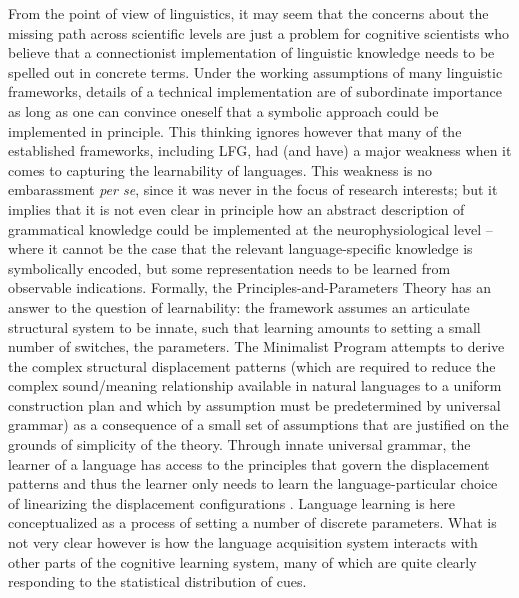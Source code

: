 \documentclass[output=paper,hidelinks]{langscibook}
\begin{document}
From the point of view of linguistics, it may seem that the concerns about the missing path across scientific levels are just a problem for cognitive scientists who believe that a connectionist implementation of linguistic knowledge needs to be spelled out in concrete terms. Under the working assumptions of many linguistic frameworks, details of a technical implementation are of subordinate importance as long as one can convince oneself that a symbolic approach could be implemented in principle.
This thinking ignores however that many of the established frameworks, including LFG, had (and have) a major weakness when it comes to capturing the learnability of languages. This weakness is no embarassment \emph{per se}, since it was never in the focus of research interests; but it implies that it is not even clear in principle how an abstract description of grammatical knowledge could be implemented at the neurophysiological level -- where it cannot be the case that the relevant language-specific knowledge is symbolically encoded, but some representation needs to be learned from observable indications. Formally, the Principles-and-Parameters Theory \citep{chomsky1981lectures} has an answer to the question of learnability: the framework assumes an articulate structural system to be innate, %
such that learning amounts to setting a small number of switches, the parameters. The Minimalist Program \citep{chomsky1995the-minimalist} attempts to derive the complex structural displacement patterns (which are required to reduce the complex sound/meaning relationship available in natural languages to a uniform construction plan and which by assumption must be predetermined by universal grammar) as a consequence of a small set of assumptions that are justified on the grounds of simplicity of the theory.  Through innate universal grammar, the learner of a language has access to the principles that govern the displacement patterns and thus the learner only needs to learn the language-particular choice of linearizing the displacement configurations \citep{cgo19}.  
Language learning is here conceptualized as a process of setting a number of discrete parameters.
What is not very clear however is how the language acquisition system interacts with other parts of the cognitive learning system, many of which are quite clearly responding to the statistical distribution of cues. 
\end{document}
